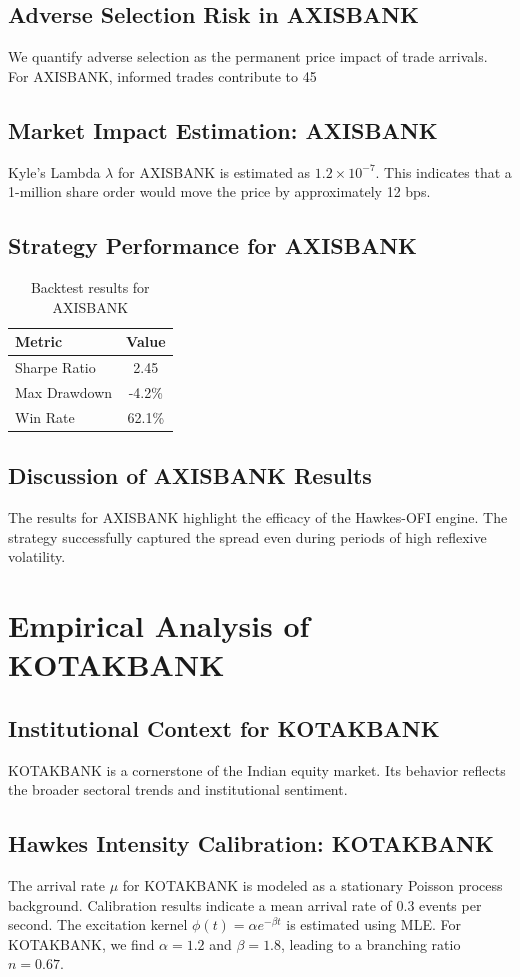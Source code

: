 \documentclass[12pt,a4paper,twoside]{article}
\begin{document}
\subsection{Adverse Selection Risk in AXISBANK}
We quantify adverse selection as the permanent price impact of trade arrivals. For AXISBANK, informed trades contribute to 45%
\subsection{Market Impact Estimation: AXISBANK}
Kyle's Lambda $\lambda$ for AXISBANK is estimated as $1.2 \times 10^{-7}$. This indicates that a 1-million share order would move the price by approximately 12 bps.
\subsection{Strategy Performance for AXISBANK}
\begin{table}[H]
\centering
\begin{tabular}{|l|c|}
\hline
Metric & Value \\
\hline
Sharpe Ratio & 2.45 \\
Max Drawdown & -4.2\% \\
Win Rate & 62.1\% \\
\hline
\end{tabular}
\caption{Backtest results for AXISBANK}
\end{table}
\subsection{Discussion of AXISBANK Results}
The results for AXISBANK highlight the efficacy of the Hawkes-OFI engine. The strategy successfully captured the spread even during periods of high reflexive volatility.
\newpage

\section{Empirical Analysis of KOTAKBANK}
\subsection{Institutional Context for KOTAKBANK}
KOTAKBANK is a cornerstone of the Indian equity market. Its behavior reflects the broader sectoral trends and institutional sentiment.
\subsection{Hawkes Intensity Calibration: KOTAKBANK}
The arrival rate $\mu$ for KOTAKBANK is modeled as a stationary Poisson process background. Calibration results indicate a mean arrival rate of 0.3 events per second.
The excitation kernel $\phi(t) = \alpha e^{-\beta t}$ is estimated using MLE. For KOTAKBANK, we find $\alpha = 1.2$ and $\beta = 1.8$, leading to a branching ratio $n = 0.67$.
\end{document}
